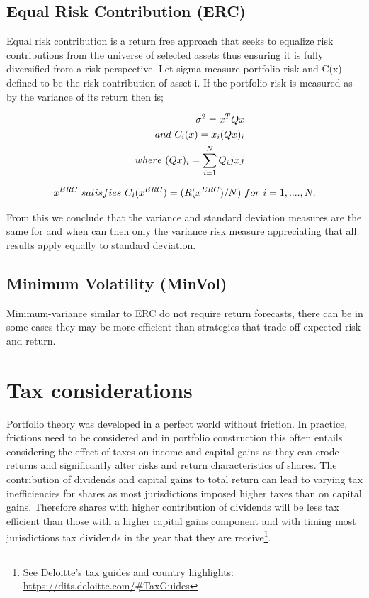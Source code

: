 \documentclass[11pt,preprint, authoryear]{elsarticle}
\numberwithin{equation}{section}
\numberwithin{figure}{section}
\numberwithin{table}{section}
\let\rmarkdownfootnote\footnote%
\def\footnote{\protect\rmarkdownfootnote}
\begin{document}
\hypertarget{equal-risk-contribution-erc}{%
\subsection{Equal Risk Contribution
(ERC)}\label{equal-risk-contribution-erc}}

Equal risk contribution is a return free approach that seeks to equalize
risk contributions from the universe of selected assets thus ensuring it
is fully diversified from a risk perspective. Let sigma measure
portfolio risk and C(x) defined to be the risk contribution of asset i.
If the portfolio risk is measured as by the variance of its return then
is;

\begin{align}
\sigma^2 = x^TQ{x}\\ and \ C_i(x)= x_i(Qx)_i \\ \notag
\quad where\ (Qx)_i =\sum_{i = 1}^{N}Q_ijxj \notag
\end{align}

\begin{align}
x^{ERC} \ satisfies \ C_i(x^{ERC}) = (R(x^{ERC})/N) \ for \ i = 1,...., N. \notag
\end{align}

From this we conclude that the variance and standard deviation measures
are the same for and when can then only the variance risk measure
appreciating that all results apply equally to standard deviation.

\hypertarget{minimum-volatility-minvol}{%
\subsection{Minimum Volatility
(MinVol)}\label{minimum-volatility-minvol}}

Minimum-variance similar to ERC do not require return forecasts, there
can be in some cases they may be more efficient than strategies that
trade off expected risk and return.

\hypertarget{tax-considerations}{%
\section{Tax considerations}\label{tax-considerations}}

Portfolio theory was developed in a perfect world without friction. In
practice, frictions need to be considered and in portfolio construction
this often entails considering the effect of taxes on income and capital
gains as they can erode returns and significantly alter risks and return
characteristics of shares. The contribution of dividends and capital
gains to total return can lead to varying tax inefficiencies for shares
as most jurisdictions imposed higher taxes than on capital gains.
Therefore shares with higher contribution of dividends will be less tax
efficient than those with a higher capital gains component and with
timing most jurisdictions tax dividends in the year that they are
receive\footnote{See Deloitte's tax guides and country highlights:
  \url{https://dits.deloitte.com/\#TaxGuides}}.
\end{document}
